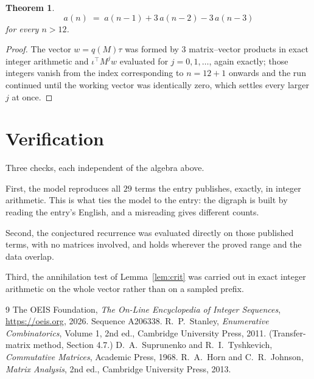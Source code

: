 \documentclass[11pt,a4paper]{article}
\theoremstyle{plain}
\newtheorem{theorem}{Theorem}
\theoremstyle{definition}
\begin{document}
\begin{theorem}
\[
a(n)\;=\;a(n-1) + 3\,a(n-2) - 3\,a(n-3)
\]
for every $n>12$.
\end{theorem}

\begin{proof}
The vector $w=q(M)\tau$ was formed by $3$ matrix--vector products in exact integer
arithmetic and $\iota^{\!\top}M^{j}w$ evaluated for $j=0,1,\dots$, again exactly; those
integers vanish from the index corresponding to $n=12+1$ onwards and the run continued
until the working vector was identically zero, which settles every larger $j$ at once.
\end{proof}

\section{Verification}

Three checks, each independent of the algebra above.

First, the model reproduces all $29$ terms the entry publishes, exactly, in integer
arithmetic. This is what ties the model to the entry: the digraph is built by reading the
entry's English, and a misreading gives different counts.

Second, the conjectured recurrence was evaluated directly on those published terms, with no
matrices involved, and holds wherever the proved range and the data overlap.

Third, the annihilation test of Lemma~\ref{lem:crit} was carried out in exact integer
arithmetic on the whole vector rather than on a sampled prefix.

\begin{thebibliography}{9}
 The OEIS Foundation, \emph{The On-Line Encyclopedia of Integer
Sequences}, \url{https://oeis.org}, 2026. Sequence A206338.
 R.~P.~Stanley, \emph{Enumerative Combinatorics}, Volume 1, 2nd ed.,
Cambridge University Press, 2011. (Transfer-matrix method, Section 4.7.)
 D.~A.~Suprunenko and R.~I.~Tyshkevich, \emph{Commutative Matrices},
Academic Press, 1968.
 R.~A.~Horn and C.~R.~Johnson, \emph{Matrix Analysis}, 2nd ed., Cambridge
University Press, 2013.
\end{thebibliography}
\end{document}
